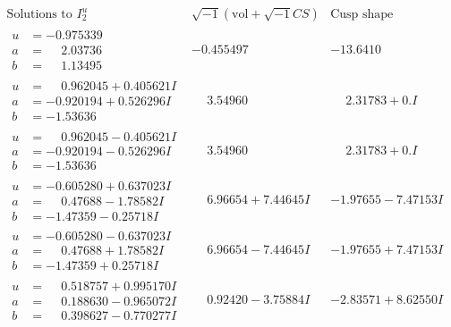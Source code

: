 \documentclass[1p]{elsarticle_modified}
\theoremstyle{definition}
\newcommand{\I}{\sqrt{-1}}
\begin{document}
$$\begin{array}{c|c|c}  
\text{Solutions to }I^u_{2}& \I (\text{vol} + \sqrt{-1}CS) & \text{Cusp shape}\\
 \hline 
\begin{aligned}
u &= -0.975339\phantom{ +0.000000I} \\
a &= \phantom{-}2.03736\phantom{ +0.000000I} \\
b &= \phantom{-}1.13495\phantom{ +0.000000I}\end{aligned}
 & -0.455497\phantom{ +0.000000I} & -13.6410\phantom{ +0.000000I} \\ \hline\begin{aligned}
u &= \phantom{-}0.962045 + 0.405621 I \\
a &= -0.920194 + 0.526296 I \\
b &= -1.53636\phantom{ +0.000000I}\end{aligned}
 & \phantom{-}3.54960\phantom{ +0.000000I} & \phantom{-}2.31783 + 0. I\phantom{ +0.000000I} \\ \hline\begin{aligned}
u &= \phantom{-}0.962045 - 0.405621 I \\
a &= -0.920194 - 0.526296 I \\
b &= -1.53636\phantom{ +0.000000I}\end{aligned}
 & \phantom{-}3.54960\phantom{ +0.000000I} & \phantom{-}2.31783 + 0. I\phantom{ +0.000000I} \\ \hline\begin{aligned}
u &= -0.605280 + 0.637023 I \\
a &= \phantom{-}0.47688 - 1.78582 I \\
b &= -1.47359 - 0.25718 I\end{aligned}
 & \phantom{-}6.96654 + 7.44645 I & -1.97655 - 7.47153 I \\ \hline\begin{aligned}
u &= -0.605280 - 0.637023 I \\
a &= \phantom{-}0.47688 + 1.78582 I \\
b &= -1.47359 + 0.25718 I\end{aligned}
 & \phantom{-}6.96654 - 7.44645 I & -1.97655 + 7.47153 I \\ \hline\begin{aligned}
u &= \phantom{-}0.518757 + 0.995170 I \\
a &= \phantom{-}0.188630 - 0.965072 I \\
b &= \phantom{-}0.398627 - 0.770277 I\end{aligned}
 & \phantom{-}0.92420 - 3.75884 I & -2.83571 + 8.62550 I \\ \hline\begin{aligned}

\end{aligned}
\end{array}$$
\end{document}
